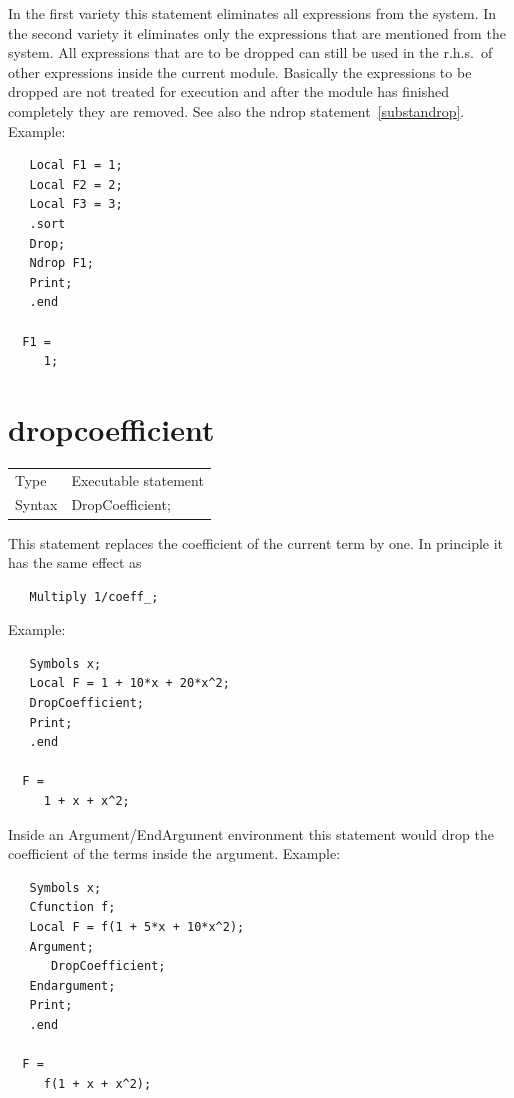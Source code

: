 \noindent In the first variety this statement eliminates all 
expressions from the system. In the second variety it 
eliminates only the expressions that are mentioned from the system. All 
expressions that are to be dropped can still be used in the r.h.s.\ of other 
expressions inside the current module. Basically the expressions to be 
dropped are not treated for execution and after the module has finished 
completely they are removed. See also the ndrop 
statement~\ref{substandrop}. Example:
\begin{verbatim}
   Local F1 = 1;
   Local F2 = 2;
   Local F3 = 3;
   .sort
   Drop;
   Ndrop F1;
   Print;
   .end

  F1 =
     1;
\end{verbatim}
\vspace{10mm}


\section{dropcoefficient}
\label{substadropcoefficient}

\noindent \begin{tabular}{ll}
Type & Executable statement\\
Syntax & DropCoefficient;
\end{tabular} \vspace{4mm}

\noindent This statement replaces the coefficient of the current term by 
one. In principle it has the same effect as
\begin{verbatim}
   Multiply 1/coeff_;
\end{verbatim}
Example:
\begin{verbatim}
   Symbols x;
   Local F = 1 + 10*x + 20*x^2;
   DropCoefficient;
   Print;
   .end

  F =
     1 + x + x^2;
\end{verbatim}
Inside an 
Argument/EndArgument environment this 
statement would drop the coefficient of the terms inside the argument. Example:
\begin{verbatim}
   Symbols x;
   Cfunction f;
   Local F = f(1 + 5*x + 10*x^2);
   Argument;
      DropCoefficient;
   Endargument;
   Print;
   .end

  F =
     f(1 + x + x^2);
\end{verbatim}
\vspace{10mm}

